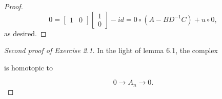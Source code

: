 \documentclass[psamsfonts,a4paper]{amsart}
\theoremstyle{plain}
\numberwithin{equation}{section}
\numberwithin{figure}{section}
\renewcommand{\b}{\beta}
\newcommand{\ra}{\rightarrow}
\newcommand{\tb}{\textbf}
\newcommand{\ot}{\otimes}
\newcommand{\op}{\oplus}
\newcommand{\<}{\langle}
\renewcommand{\>}{\rangle}
\theoremstyle{named}
\theoremstyle{name}
\begin{document}
\begin{proof}
$$ 0 = \begin{bmatrix}
1 & 0 \end{bmatrix}  \begin{bmatrix}
1 \\ 0 \end{bmatrix} 
 - id = 0 \circ (A-BD^{-1}C) + u \circ 0,  $$
as desired. 

\end{proof}

\vspace{10mm}

\begin{proof}[Second proof of Exercise 2.1]
In the light of lemma 6.1, the complex\\

\begin{center}
\end{center}
is homotopic to 

$$ 0 \ra A_n \ra 0.$$

\end{proof}
\end{document}
